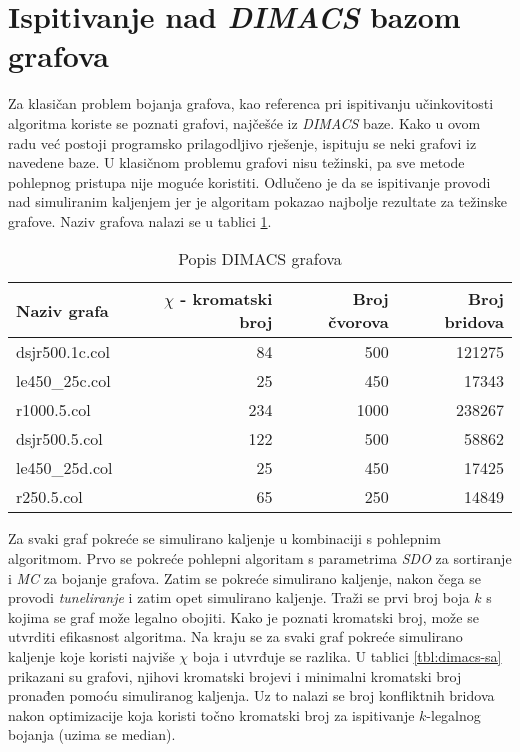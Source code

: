 \documentclass[times, utf8, diplomski, numeric]{fer}
\begin{document}
\section{Ispitivanje nad \emph{DIMACS} bazom grafova}

Za klasičan problem bojanja grafova, kao referenca pri ispitivanju učinkovitosti algoritma koriste se poznati grafovi, najčešće iz \emph{DIMACS} baze. Kako u ovom radu već postoji programsko prilagodljivo rješenje, ispituju se neki grafovi iz navedene baze. U klasičnom problemu grafovi nisu težinski, pa sve metode pohlepnog pristupa nije moguće koristiti. Odlučeno je da se ispitivanje provodi nad simuliranim kaljenjem jer je algoritam pokazao najbolje rezultate za težinske grafove. Naziv grafova nalazi se u tablici \ref{tbl:dimacs}.

\begin{table}[htb]
	\caption{Popis DIMACS grafova}
	\label{tbl:dimacs}
	\centering
	\begin{tabular}{|l||r|r|r|} \hline
	Naziv grafa & $\chi$ - kromatski broj & Broj čvorova & Broj bridova\\ \hline \hline
	dsjr500.1c.col & 84 & 500 & 121275 \\ \hline 
	le450\_25c.col & 25 & 450 & 17343 \\  \hline
	r1000.5.col & 234 & 1000 & 238267 \\ \hline
	dsjr500.5.col & 122 & 500 & 58862 \\  \hline 
	le450\_25d.col & 25 & 450 & 17425 \\ \hline
	r250.5.col & 65 & 250 & 14849 \\ \hline
	\end{tabular}
\end{table}

Za svaki graf pokreće se simulirano kaljenje u kombinaciji s pohlepnim algoritmom. Prvo se pokreće pohlepni algoritam s parametrima \emph{SDO} za sortiranje i \emph{MC} za bojanje grafova. Zatim se pokreće simulirano kaljenje, nakon čega se provodi \emph{tuneliranje} i zatim opet simulirano kaljenje. Traži se prvi broj boja $k$ s kojima se graf može legalno obojiti. Kako je poznati kromatski broj, može se utvrditi efikasnost algoritma. Na kraju se za svaki graf pokreće simulirano kaljenje koje koristi najviše $\chi$ boja i utvrđuje se razlika. U tablici \ref{tbl:dimacs-sa} prikazani su grafovi, njihovi kromatski brojevi i minimalni kromatski broj pronađen pomoću simuliranog kaljenja. Uz to nalazi se broj konfliktnih bridova nakon optimizacije koja koristi točno kromatski broj za ispitivanje $k$-legalnog bojanja (uzima se median).
\end{document}
